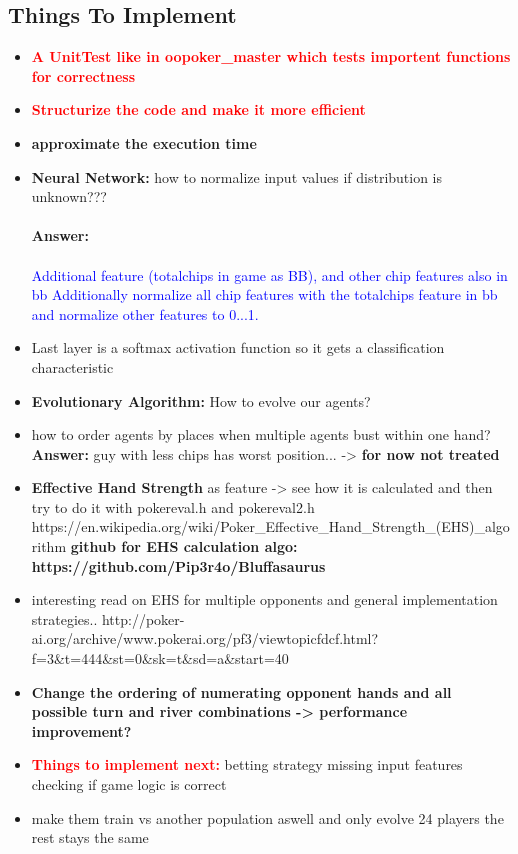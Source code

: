 \subsection{Things To Implement}
\begin{itemize}
\item \textbf{\textcolor{red}{A UnitTest like in oopoker\_master which tests importent functions for correctness}}
\item \textbf{\textcolor{red}{Structurize the code and make it more efficient}}
\item \textbf{approximate the execution time}
\item \textbf{Neural Network:} how to normalize input values if distribution is unknown???\\\\
\textbf{Answer:}\\\\
\textcolor{blue}{Additional feature (totalchips in game as BB), and other chip features also in bb
Additionally normalize all chip features with the totalchips feature in bb and normalize other features to 0...1. }
\item Last layer is a softmax activation function so it gets a classification characteristic
\item \textbf{Evolutionary Algorithm:} How to evolve our agents?
\item how to order agents by places when multiple agents bust within one hand?
\subitem \textbf{Answer:} guy with less chips has worst position... -> \textbf{for now not treated}
\item \textbf{Effective Hand Strength} as feature -> see how it is calculated and then try to do it with pokereval.h and pokereval2.h
\subitem https://en.wikipedia.org/wiki/Poker\_Effective\_Hand\_Strength\_(EHS)\_algorithm
\subitem \textbf{github for EHS calculation algo: https://github.com/Pip3r4o/Bluffasaurus}
\item interesting read on EHS for multiple opponents and general implementation strategies.. 
http://poker-ai.org/archive/www.pokerai.org/pf3/viewtopicfdcf.html?f=3\&t=444\&st=0\&sk=t\&sd=a\&start=40
\item \textbf{Change the ordering of numerating opponent hands and all possible turn and river combinations -> performance improvement?}
\item \textbf{\textcolor{red}{Things to implement next:}}
\subitem betting strategy
\subitem missing input features
\subitem checking if game logic is correct
\item make them train vs another population aswell and only evolve 24 players the rest stays the same

\end{itemize}
